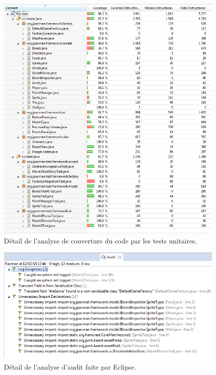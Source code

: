 \documentclass[12pt,a4paper,final]{article}
\begin{document}
\begin{figure}[ht]
	\centering
	\includegraphics[width=\textwidth]{images/CoverageTest.png}
	\caption{\label{CoverageTest}Détail de l'analyse de couverture du code par les tests unitaires.}
\end{figure}


\begin{figure}[ht]
	\centering
	\includegraphics[width=\textwidth]{images/Audit.png}
	\caption{\label{Audit}Détail de l'analyse d'audit faite par Eclipse.}
\end{figure}


\newpage


\end{document}
